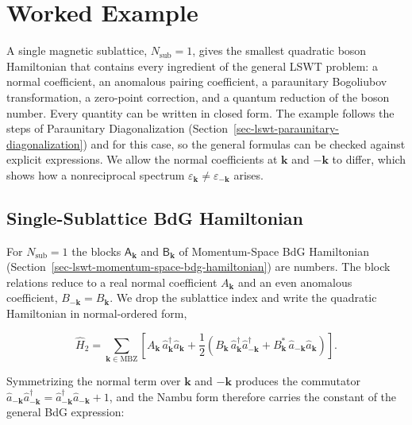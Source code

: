 
\hypertarget{sec-lswt-worked-example}{%
\section{Worked Example}\label{sec-lswt-worked-example}}

A single magnetic sublattice, \(N_{\mathrm{sub}}=1\), gives the smallest quadratic boson Hamiltonian that contains every ingredient of the general LSWT problem: a normal coefficient, an anomalous pairing coefficient, a paraunitary Bogoliubov transformation, a zero-point correction, and a quantum reduction of the boson number. Every quantity can be written in closed form. The example follows the steps of Paraunitary Diagonalization (Section~\ref{sec-lswt-paraunitary-diagonalization}) and  for this case, so the general formulas can be checked against explicit expressions. We allow the normal coefficients at \(\mathbf k\) and \(-\mathbf k\) to differ, which shows how a nonreciprocal spectrum \(\varepsilon_{\mathbf k}\ne\varepsilon_{-\mathbf k}\) arises.

\subsection{Single-Sublattice BdG Hamiltonian}

For \(N_{\mathrm{sub}}=1\) the blocks \(\mathsf A_{\mathbf k}\) and \(\mathsf B_{\mathbf k}\) of Momentum-Space BdG Hamiltonian (Section~\ref{sec-lswt-momentum-space-bdg-hamiltonian}) are numbers. The block relations reduce to a real normal coefficient \(A_{\mathbf k}\) and an even anomalous coefficient, \(B_{-\mathbf k}=B_{\mathbf k}\). We drop the sublattice index and write the quadratic Hamiltonian in normal-ordered form,

\[
\hat H_2
=\sum_{\mathbf k\in\mathrm{MBZ}}\left[A_{\mathbf k}\,\hat a_{\mathbf k}^\dagger\hat a_{\mathbf k}
+\frac12\left(B_{\mathbf k}\,\hat a_{\mathbf k}^\dagger\hat a_{-\mathbf k}^\dagger+B_{\mathbf k}^*\,\hat a_{-\mathbf k}\hat a_{\mathbf k}\right)\right].
\]

Symmetrizing the normal term over \(\mathbf k\) and \(-\mathbf k\) produces the commutator \(\hat a_{-\mathbf k}\hat a_{-\mathbf k}^\dagger=\hat a_{-\mathbf k}^\dagger\hat a_{-\mathbf k}+1\), and the Nambu form therefore carries the constant of the general BdG expression:

